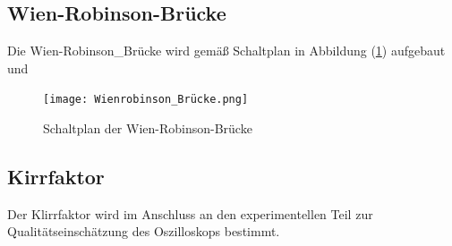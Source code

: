 \subsection{Wien-Robinson-Brücke}
Die Wien-Robinson_Brücke wird gemäß Schaltplan in Abbildung (\ref{pic:Wien-Robinson-Brücke}) aufgebaut und 
\begin{figure}[H]
    \centering
    \texttt{[image: Wienrobinson\_Brücke.png]}
    \caption{Schaltplan der Wien-Robinson-Brücke}
    \label{pic:Wien-Robinson-Brücke}
\end{figure} 
\subsection{Kirrfaktor}
Der Klirrfaktor wird im Anschluss an den experimentellen Teil zur Qualitätseinschätzung des Oszilloskops bestimmt. 